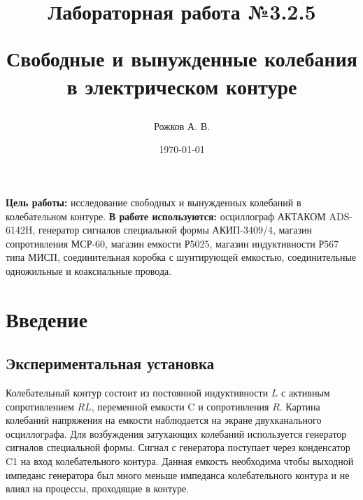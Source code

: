 \documentclass[a4paper, 12pt]{article}
\title{\begin{center}Лабораторная работа №3.2.5\end{center}
Свободные и вынужденные колебания в электрическом контуре}
\author{Рожков А. В.}
\date{\today}
\begin{document}
    \maketitle
    \newpage
    \renewcommand*{\thesubsection}{\thesection.\Alph{subsection}}

    \textbf{Цель работы:} исследование свободных и вынужденных колебаний в
колебательном контуре.
    \textbf{В работе используются:} осциллограф АКТАКОМ ADS-6142H, генератор сигналов специальной формы АКИП-3409/4, магазин сопротивления МСР-60, магазин емкости Р5025, магазин индуктивности Р567 типа МИСП, соединительная коробка с шунтирующей емкостью, соединительные одножильные и коаксиальные провода.

    \section{Введение}
        \subsection*{Экспериментальная установка}
            Колебательный контур состоит из постоянной индуктивности $L$ с активным сопротивлением $RL$, переменной емкости C и сопротивления $R$. Картина колебаний напряжения на емкости наблюдается на экране двухканального осциллографа. Для возбуждения затухающих колебаний используется генератор сигналов специальной формы. Сигнал с генератора поступает через конденсатор C1 на вход колебательного контура. Данная емкость необходима чтобы выходной импеданс генератора был много меньше импеданса колебательного контура и не влиял на процессы, проходящие в контуре.
\end{document}
